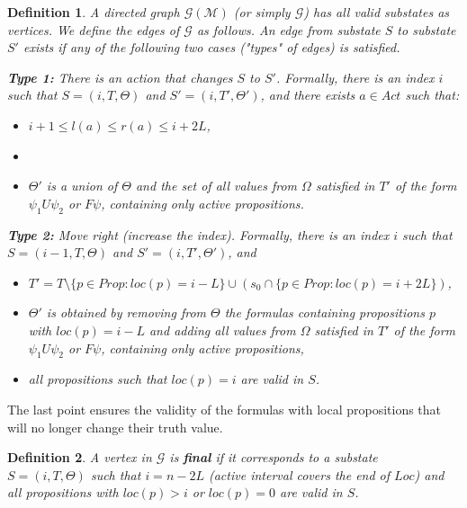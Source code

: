 \documentclass[]{jair}
\newtheorem{Definition}{Definition}
\begin{document}
\begin{Definition}\label{g}
A directed graph $\mathcal{G(M)}$ (or simply $\mathcal{G}$)
has all valid substates as vertices. We define the edges of $\mathcal{G}$ as follows.
An edge from substate $S$ to substate $S'$ exists if any of the following two cases ("types" of edges) is satisfied.

{\bf Type 1:} There is an action that changes $S$ to $S'$. Formally, there is an index $i$ such that $S=(i, T, \Theta)$ and $S'=(i, T', \Theta')$, and there exists $a\in Act$ such that:
\begin{itemize}
    \item $i+1 \le l(a) \le r(a) \le i+2L$,
    \item {}
    \item $\Theta'$ is a union of $\Theta$ and the set of all values from $\Omega$ satisfied in $T'$ of the form $\psi_1 U \psi_2$ or $F\psi$, containing only active propositions.
\end{itemize}

{\bf Type 2:} Move right (increase the index). Formally, there is an index $i$ such that
$S=(i-1, T, \Theta)$ and $S'=(i, T', \Theta')$, and
\begin{itemize}
    \item $T'=T\setminus\{p\in Prop : loc(p)=i-L\}\cup(s_0\cap\{p\in Prop : loc(p)=i+2L\})$,
    \item $\Theta'$ is obtained by removing from $\Theta$ the formulas containing propositions $p$ with
        $loc(p)=i-L$ and adding all values from $\Omega$ satisfied in $T'$ of the form $\psi_1 U \psi_2$ or $F\psi$, containing only active propositions,
    \item all propositions such that $loc(p)=i$ are valid in $S$.
\end{itemize}
\end{Definition}

The last point ensures the validity of the formulas with local propositions that will no longer change their truth value.
 
\begin{Definition}
A vertex in $\mathcal{G}$ is {\bf final} if it corresponds to a substate $S=(i, T, \Theta)$ such that $i=n-2L$
    (active interval covers the end of $Loc$) and all propositions with $loc(p)>i$ or $loc(p)=0$ are valid in $S$.
\end{Definition}
\end{document}
